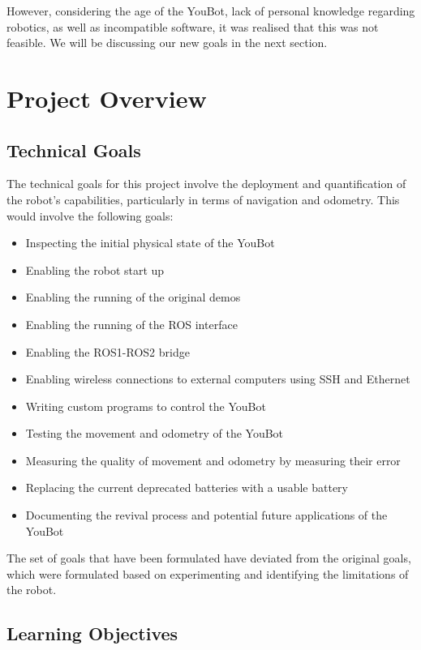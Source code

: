 \documentclass[a4paper, 12pt]{article}
\begin{document}
    However, considering the age of the YouBot, lack of personal knowledge regarding robotics, as well as incompatible software, it was realised that this was not feasible. We will be discussing our new goals in the next section. 

    \pagebreak
    
    \section{Project Overview}

    \subsection{Technical Goals}

    The technical goals for this project involve the deployment and quantification of the robot's capabilities, particularly in terms of navigation and odometry. This would involve the following goals: 
    \begin{itemize}[noitemsep, topsep=0pt]
        \item Inspecting the initial physical state of the YouBot
        \item Enabling the robot start up
        \item Enabling the running of the original demos
        \item Enabling the running of the ROS interface
        \item Enabling the ROS1-ROS2 bridge
        \item Enabling wireless connections to external computers using SSH and Ethernet
        \item Writing custom programs to control the YouBot
        \item Testing the movement and odometry of the YouBot
        \item Measuring the quality of movement and odometry by measuring their error
        \item Replacing the current deprecated batteries with a usable battery
        \item Documenting the revival process and potential future applications of the YouBot
    \end{itemize}
    
    The set of goals that have been formulated have deviated from the original goals, which were formulated based on experimenting and identifying the limitations of the robot. 

    \subsection{Learning Objectives}
\end{document}
